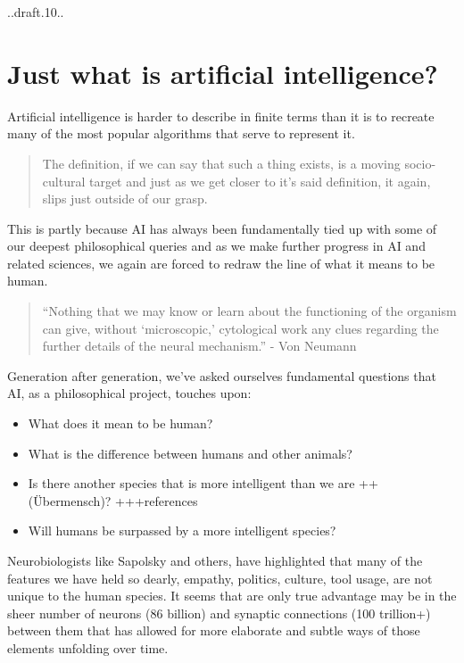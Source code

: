 \documentclass[]{book}
\providecommand{\tightlist}{%
  \setlength{\itemsep}{0pt}\setlength{\parskip}{0pt}}
\theoremstyle{definition}
\theoremstyle{definition}
\theoremstyle{definition}
\theoremstyle{remark}
\begin{document}
..draft.10..

\section{Just what is artificial
intelligence?}\label{just-what-is-artificial-intelligence}

Artificial intelligence is harder to describe in finite terms than it is
to recreate many of the most popular algorithms that serve to represent
it.

\begin{quote}
The definition, if we can say that such a thing exists, is a moving
socio-cultural target and just as we get closer to it's said definition,
it again, slips just outside of our grasp.
\end{quote}

This is partly because AI has always been fundamentally tied up with
some of our deepest philosophical queries and as we make further
progress in AI and related sciences, we again are forced to redraw the
line of what it means to be human.

\begin{quote}
``Nothing that we may know or learn about the functioning of the
organism can give, without `microscopic,' cytological work any clues
regarding the further details of the neural mechanism.'' - Von Neumann
\end{quote}

Generation after generation, we've asked ourselves fundamental questions
that AI, as a philosophical project, touches upon:

\begin{itemize}
\tightlist
\item
  What does it mean to be human?
\item
  What is the difference between humans and other animals?
\item
  Is there another species that is more intelligent than we are
  ++(Übermensch)? +++references
\item
  Will humans be surpassed by a more intelligent species?
\end{itemize}

Neurobiologists like Sapolsky and others, have highlighted that many of
the features we have held so dearly, empathy, politics, culture, tool
usage, are not unique to the human species. It seems that are only true
advantage may be in the sheer number of neurons (86 billion) and
synaptic connections (100 trillion+) between them that has allowed for
more elaborate and subtle ways of those elements unfolding over time.
\end{document}
